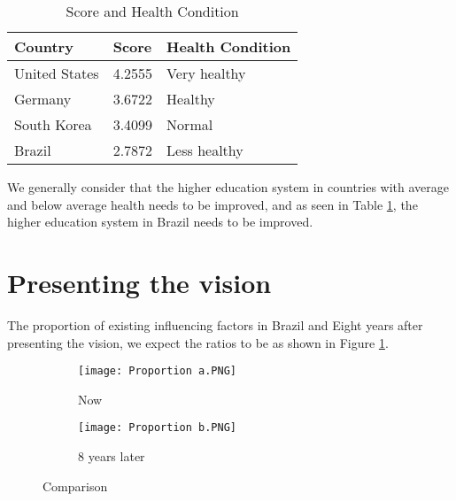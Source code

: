 \documentclass[12pt]{article}  %
\begin{document}
\begin{table}[htp]
	\caption{Score and Health Condition}
	\begin{center}
	\begin{tabular}{|l|l|l|}
		\hline
		Country       & Score  & Health Condition \\ \hline
		United States & 4.2555 & Very healthy     \\ \hline
		Germany       & 3.6722 & Healthy          \\ \hline
		South Korea   & 3.4099 & Normal           \\ \hline
		Brazil        & 2.7872 & Less healthy     \\ \hline
	\end{tabular}\label{tb:uuu}
	\end{center}
\end{table}
We generally consider that the higher education system in countries with average and below average health needs to be improved, and as seen in Table \ref{tb:uuu}, the higher education system in Brazil needs to be improved.

\section {Presenting the vision}

The proportion of existing influencing factors in Brazil and Eight years after presenting the vision, we expect the ratios to be as shown in Figure \ref{fig:ccc}.
\newpage
\begin{figure}[htp]
	\centering
	\begin{subfigure}[b]{.4\textwidth}
		\texttt{[image: Proportion a.PNG]}
		\caption{Now}
	\end{subfigure}
	\begin{subfigure}[b]{.4\textwidth}
		\texttt{[image: Proportion b.PNG]}
		\caption{8 years later}
	\end{subfigure}
	\caption{Comparison}\label{fig:ccc}
\end{figure}

\end{document}
